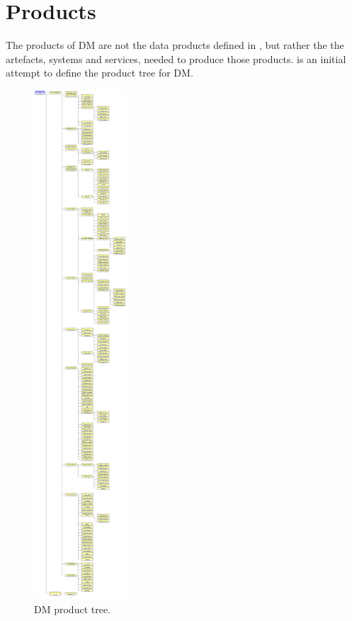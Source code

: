 \section {Products}
\label{sect:products}

The products of DM are not the data products defined in , but rather the the artefacts, systems and services, needed to produce those products.
 is an initial attempt to define the product tree for DM.

\begin{figure}[htbp]
\begin{center}
  \includegraphics[height=19cm]{ProductTree}
\caption{DM product tree. \label{fig:prods}}
\end{center}
\end{figure}

